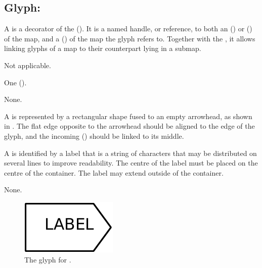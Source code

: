 \subsection{Glyph: }
\label{sec:submapTerminal}

A  is a decorator of the  ().
It is a named handle, or reference, to both an  () or  () of the map, and a  () of the map the  glyph refers to.
Together with the , it allows linking glyphs of a map to their counterpart lying in a submap.

\begin{glyphDescription}

\glyphSboTerm Not applicable.

\glyphIncoming
One  ().

\glyphOutgoing
None.

\glyphContainer A  is represented by a rectangular shape fused to an empty arrowhead, as shown in .
The flat edge opposite to the arrowhead should be aligned to the edge of the  glyph, and the incoming  () should be linked to its middle.

\glyphLabel A  is identified by a label that is  a string of characters that may be distributed on several lines to improve readability.
The centre of the label must be placed on the centre of the container.
The label may extend outside of the container.

\glyphAux
None.

\end{glyphDescription}

\begin{figure}[H]
  \centering
  \includegraphics{images/build/submap_terminal.pdf}
  \caption{The \PD glyph for .}
  \label{fig:submapTerminal}
\end{figure}
